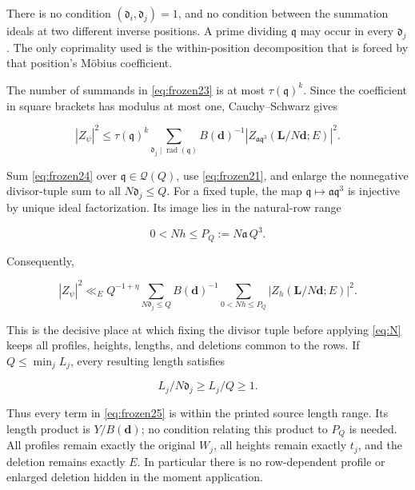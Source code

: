 \documentclass[11pt]{article}
\theoremstyle{remark}\newtheorem{remark}[theorem]{Remark}
\begin{document}
There is no condition \((\mathfrak d_i,\mathfrak d_j)=1\), and no condition between the summation ideals at two different inverse positions. A prime dividing \(\mathfrak q\) may occur in every \(\mathfrak d_j\). The only coprimality used is the within-position decomposition that is forced by that position's Möbius coefficient.

The number of summands in \eqref{eq:frozen23} is at most \(\tau(\mathfrak q)^k\). Since the coefficient in square brackets has modulus at most one, Cauchy--Schwarz gives

\begin{equation}
|Z_\psi|^2
\le\tau(\mathfrak q)^k
\sum_{\mathfrak d_j\mid\operatorname{rad}(\mathfrak q)}
B(\mathbf d)^{-1}
|Z_{\mathfrak a\mathfrak q^3}(\mathbf L/N\mathbf d;E)|^2.
\label{eq:frozen24}
\end{equation}

Sum \eqref{eq:frozen24} over \(\mathfrak q\in\mathcal Q(Q)\), use \eqref{eq:frozen21}, and enlarge the nonnegative divisor-tuple sum to all \(N\mathfrak d_j\le Q\). For a fixed tuple, the map \(\mathfrak q\mapsto\mathfrak a\mathfrak q^3\) is injective by unique ideal factorization. Its image lies in the natural-row range

\[
0<Nh\le P_Q:=N\mathfrak a\,Q^3.
\]

Consequently,

\begin{equation}
|Z_\psi|^2\ll_E Q^{-1+\eta}
\sum_{N\mathfrak d_j\le Q}B(\mathbf d)^{-1}
\sum_{0<Nh\le P_Q}
|Z_h(\mathbf L/N\mathbf d;E)|^2.
\label{eq:frozen25}
\end{equation}

This is the decisive place at which fixing the divisor tuple before applying \eqref{eq:N} keeps all profiles, heights, lengths, and deletions common to the rows. If \(Q\le\min_jL_j\), every resulting length satisfies

\begin{equation}
L_j/N\mathfrak d_j\ge L_j/Q\ge1.
\label{eq:frozen26}
\end{equation}

Thus every term in \eqref{eq:frozen25} is within the printed source length range. Its length product is \(Y/B(\mathbf d)\); no condition relating this product to \(P_Q\) is needed. All profiles remain exactly the original \(W_j\), all heights remain exactly \(t_j\), and the deletion remains exactly \(E\). In particular there is no row-dependent profile or enlarged deletion hidden in the moment application.
\end{document}
